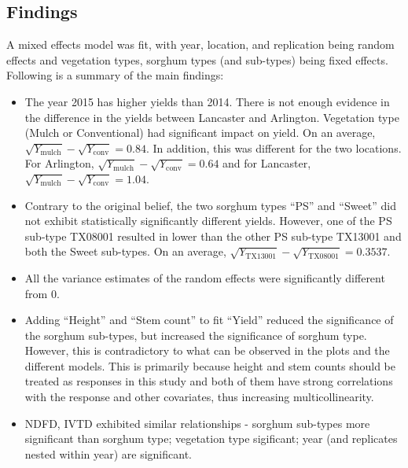 \subsection*{Findings}
A mixed effects model was fit, with year, location, and replication being random effects and vegetation types, sorghum types (and sub-types) being fixed effects. Following is a summary of the main findings:
\begin{itemize}
\item The year 2015 has higher yields than 2014. There is not enough evidence in the difference in the yields between Lancaster and Arlington. Vegetation type (Mulch or Conventional) had significant impact on yield. On an average, $\sqrt{Y_{\text{mulch}}} - \sqrt{Y_{\text{conv}}} = 0.84$. In addition, this was different for the two locations. For Arlington, $\sqrt{Y_{\text{mulch}}} - \sqrt{Y_{\text{conv}}} = 0.64$ and for Lancaster, $\sqrt{Y_{\text{mulch}}} - \sqrt{Y_{\text{conv}}} = 1.04$. 
\item Contrary to the original belief, the two sorghum types ``PS'' and ``Sweet'' did not exhibit statistically significantly different yields. However, one of the PS sub-type TX08001 resulted in lower than the other PS sub-type TX13001 and both the Sweet sub-types. On an average, $\sqrt{Y_{\text{TX13001}}} - \sqrt{Y_{\text{TX08001}}} = 0.3537$. 
\item All the variance estimates of the random effects were significantly different from 0. 
\item Adding ``Height'' and ``Stem count'' to fit ``Yield'' reduced the significance of the sorghum sub-types, but increased the significance of sorghum type. However, this is contradictory to what can be observed in the plots and the different models. This is primarily because height and stem counts should be treated as responses in this study and both of them have strong correlations with the response and other covariates, thus increasing multicollinearity. 
\item NDFD, IVTD exhibited similar relationships - sorghum sub-types more significant than sorghum type; vegetation type sigificant; year (and replicates nested within year) are significant. 
\end{itemize}

